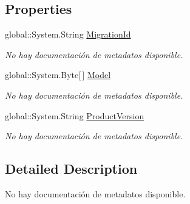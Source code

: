 \subsection*{Properties}
\begin{DoxyCompactItemize}
\item 
global\-::\-System.\-String \hyperlink{class_microsoft_1_1_samples_1_1_kinect_1_1_basic_interactions_1_1_c_____migration_history_a4f7d46a893bdcb60c23fc9f347293413}{Migration\-Id}
\begin{DoxyCompactList}\small\item\em No hay documentación de metadatos disponible. \end{DoxyCompactList}\item 
global\-::\-System.\-Byte\mbox{[}$\,$\mbox{]} \hyperlink{class_microsoft_1_1_samples_1_1_kinect_1_1_basic_interactions_1_1_c_____migration_history_a0e2dee1d4a21289499ebcf7943854e39}{Model}
\begin{DoxyCompactList}\small\item\em No hay documentación de metadatos disponible. \end{DoxyCompactList}\item 
global\-::\-System.\-String \hyperlink{class_microsoft_1_1_samples_1_1_kinect_1_1_basic_interactions_1_1_c_____migration_history_a6703139c33da8e0a252dd8be924b8b47}{Product\-Version}
\begin{DoxyCompactList}\small\item\em No hay documentación de metadatos disponible. \end{DoxyCompactList}\end{DoxyCompactItemize}


\subsection{Detailed Description}
No hay documentación de metadatos disponible. 




